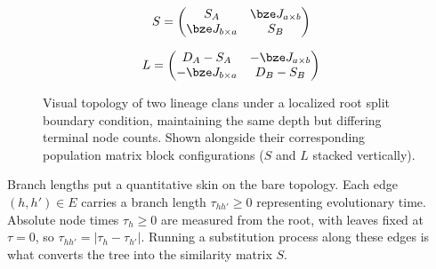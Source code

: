 \begin{figure}[t]
\begin{minipage}[c]{0.5\textwidth}
{%
}
\vspace{2mm}
\end{minipage}%
\hfill
\begin{minipage}[c]{0.45\textwidth}
\centering

\[
S=\begin{pmatrix} S_A & \bze J_{a\times b}\\ \bze J_{b\times a} & S_B\end{pmatrix}
\]
\vspace{1mm}

\vspace{8mm}

\[
L=\begin{pmatrix} D_A-S_A & -\bze J_{a\times b}\\ -\bze J_{b\times a} & D_B-S_B\end{pmatrix}
\]
\vspace{1mm}

\end{minipage}

\vspace{4mm}
\caption{Visual topology of two lineage clans under a localized root split
boundary condition, maintaining the same depth but differing terminal node
counts. Shown alongside their corresponding population matrix block
configurations ($S$ and $L$ stacked vertically).}
\label{fig:structural_split_balanced}
\end{figure}

Branch lengths put a quantitative skin on the bare topology. Each edge
$(h, h') \in E$ carries a branch length $\tau_{hh'} \ge 0$ representing
evolutionary time. Absolute node times $\tau_h \ge 0$ are measured from the root,
with leaves fixed at $\tau = 0$, so $\tau_{hh'} = |\tau_h - \tau_{h'}|$. Running a
substitution process along these edges is what converts the tree into the
similarity matrix $S$.

